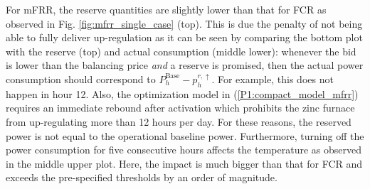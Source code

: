 \documentclass[conference]{IEEEtran}
\begin{document}
For mFRR, the reserve quantities are slightly lower than that for FCR as observed in Fig. \ref{fig:mfrr_single_case} (top). This is due the penalty of not being able to fully deliver  up-regulation as it can be seen by comparing the bottom plot with the reserve (top) and actual consumption (middle lower): whenever the bid is lower than the balancing price \textit{and} a reserve is promised, then the actual power consumption should correspond to $P^{\text{Base}}_{h} - p_{h}^{r, \uparrow}$. For example, this does not happen in hour 12. Also, the optimization model in (\ref{P1:compact_model_mfrr}) requires an immediate rebound after activation which prohibits the zinc furnace from up-regulating more than 12 hours per day. For these reasons, the reserved power is not equal to the operational baseline power.
Furthermore, turning off the power consumption for five consecutive hours  affects the temperature as observed in the middle upper plot. Here, the impact is much bigger than that for FCR and exceeds the pre-specified thresholds by an order of magnitude.
\end{document}

